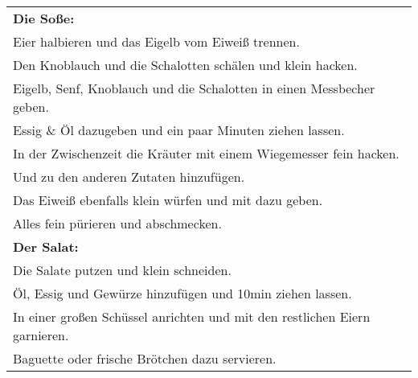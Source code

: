 \begin{tabular}{p{15cm}}
  \textbf{Die Soße:}\\
	Eier halbieren und das Eigelb vom Eiweiß trennen.\\
  Den Knoblauch und die Schalotten schälen und klein hacken.\\
	Eigelb, Senf, Knoblauch und die Schalotten in einen Messbecher geben.\\
	Essig \& Öl dazugeben und ein paar Minuten ziehen lassen.\\
	In der Zwischenzeit die Kräuter mit einem Wiegemesser fein hacken.\\
  Und zu den anderen Zutaten hinzufügen.\\
	Das Eiweiß ebenfalls klein würfen und mit dazu geben.\\
	Alles fein pürieren und abschmecken.\\
  \textbf{Der Salat:}\\
  Die Salate putzen und klein schneiden.\\
	Öl, Essig und Gewürze hinzufügen und 10min ziehen lassen.\\
	In einer großen Schüssel anrichten und mit den restlichen Eiern garnieren.\\
	Baguette oder frische Brötchen dazu servieren.\\
\end{tabular}
